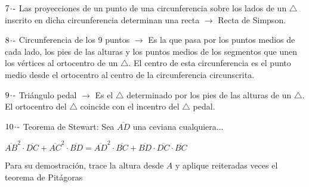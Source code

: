 \vspace{0.5cm}

$7\hspace{-0.05cm}\cdot\hspace{-0.05cm}\text{-}$ Las proyecciones de un punto de una circunferencia sobre los lados de un $\triangle$ inscrito en dicha circunferencia determinan una recta $\longrightarrow$ Recta de Simpson.

\vspace{0.5cm}

$8\hspace{-0.05cm}\cdot\hspace{-0.05cm}\text{-}$ Circunferencia de los 9 puntos $\longrightarrow$ Es la que pasa por los puntos medios de cada lado, los pies de las alturas y los puntos medios de los segmentos que unen los vértices al ortocentro de un $\triangle$. El centro de esta circunferencia es el punto medio desde el ortocentro al centro de la circunferencia circunscrita.

\vspace{0.5cm}

$9\hspace{-0.05cm}\cdot\hspace{-0.05cm}\text{-}$ Triángulo pedal $\longrightarrow$ Es el $\triangle$ determinado por los pies de las alturas de un $\triangle$. El ortocentro del $\triangle$ coincide con el incentro del $\triangle$ pedal.

\vspace{0.5cm}

$ 10\hspace{-0.05cm}\cdot\hspace{-0.05cm}\text{-} $ Teorema de Stewart: Sea $\overline{AD} $ una ceviana cualquiera...

\noindent\parbox[][][t]{.4\linewidth}{
}
\parbox[][][t]{.05\linewidth}{\hspace{.05\linewidth}}
\parbox[][][t]{.55\linewidth}{
 $\overline{AB}^2\cdot\overline{DC} + \overline{AC}^2\cdot\overline{BD} = \overline{AD}^2\cdot\overline{BC} + \overline{BD}\cdot\overline{DC}\cdot\overline{BC}$
 
 \vspace{0.4cm}
 
 Para su demostración, trace la altura desde $A$ y aplique reiteradas veces el teorema de Pitágoras
 
}

